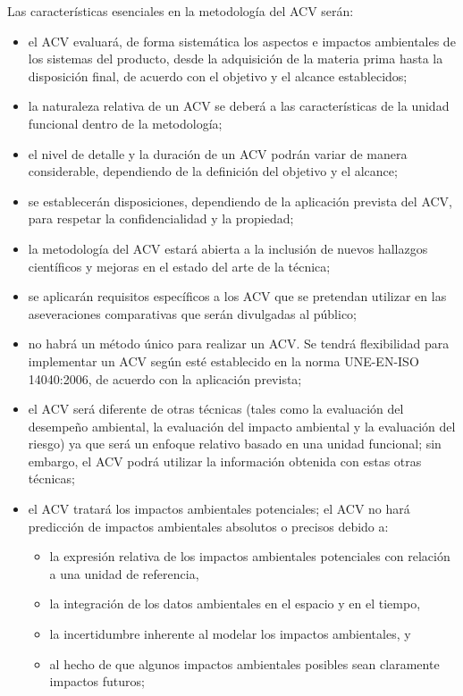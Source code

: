 Las características esenciales en la metodología del ACV serán:
\begin{itemize}
  \item el ACV evaluará, de forma sistemática los aspectos e impactos ambientales de los sistemas del producto, desde la adquisición de la materia prima hasta la disposición final, de acuerdo con el objetivo y el alcance establecidos;
  \item la naturaleza relativa de un ACV se deberá a las características de la unidad funcional dentro de la metodología;
  \item el nivel de detalle y la duración de un ACV podrán variar de manera considerable, dependiendo de la definición del objetivo y el alcance;
  \item se establecerán disposiciones, dependiendo de la aplicación prevista del ACV, para respetar la confidencialidad y la propiedad;
  \item la metodología del ACV estará abierta a la inclusión de nuevos hallazgos científicos y mejoras en el estado del arte de la técnica;
  \item se aplicarán requisitos específicos a los ACV que se pretendan utilizar en las aseveraciones comparativas que serán divulgadas al público;
  \item no habrá un método único para realizar un ACV. Se tendrá flexibilidad para implementar un ACV según esté establecido en la norma UNE-EN-ISO 14040:2006, de acuerdo con la aplicación prevista;
  \item el ACV será diferente de otras técnicas (tales como la evaluación del desempeño ambiental, la evaluación del impacto ambiental y la evaluación del riesgo) ya que será un enfoque relativo basado en una unidad funcional; sin embargo, el ACV podrá utilizar la información obtenida con estas otras técnicas;
  \item el ACV tratará los impactos ambientales potenciales; el ACV no hará predicción de impactos ambientales absolutos o precisos debido a:
  \begin{itemize}
    \item la expresión relativa de los impactos ambientales potenciales con relación a una unidad de referencia,
    \item la integración de los datos ambientales en el espacio y en el tiempo,
    \item la incertidumbre inherente al modelar los impactos ambientales, y
    \item al hecho de que algunos impactos ambientales posibles sean claramente impactos futuros;

\end{itemize}
\end{itemize}
